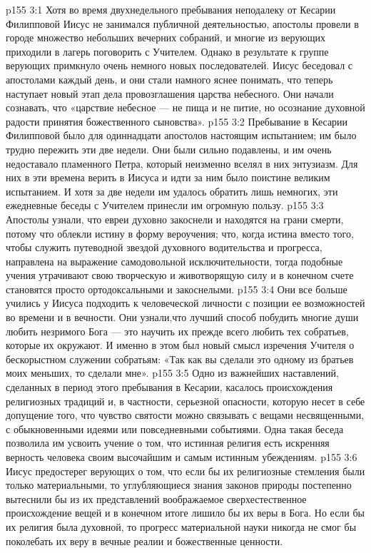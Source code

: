 \vs p155 3:1 Хотя во время двухнедельного пребывания неподалеку от Кесарии Филипповой Иисус не занимался публичной деятельностью, апостолы провели в городе множество небольших вечерних собраний, и многие из верующих приходили в лагерь поговорить с Учителем. Однако в результате к группе верующих примкнуло очень немного новых последователей. Иисус беседовал с апостолами каждый день, и они стали намного яснее понимать, что теперь наступает новый этап дела провозглашения царства небесного. Они начали сознавать, что «царствие небесное --- не пища и не питие, но осознание духовной радости принятия божественного сыновства».
\vs p155 3:2 Пребывание в Кесарии Филипповой было для одиннадцати апостолов настоящим испытанием; им было трудно пережить эти две недели. Они были сильно подавлены, и им очень недоставало пламенного Петра, который неизменно вселял в них энтузиазм. Для них в эти времена верить в Иисуса и идти за ним было поистине великим испытанием. И хотя за две недели им удалось обратить лишь немногих, эти ежедневные беседы с Учителем принесли им огромную пользу.
\vs p155 3:3 Апостолы узнали, что евреи духовно закоснели и находятся на грани смерти, потому что облекли истину в форму вероучения; что, когда истина вместо того, чтобы служить путеводной звездой духовного водительства и прогресса, направлена на выражение самодовольной исключительности, тогда подобные учения утрачивают свою творческую и животворящую силу и в конечном счете становятся просто ортодоксальными и закоснелыми.
\vs p155 3:4 Они все больше учились у Иисуса подходить к человеческой личности с позиции ее возможностей во времени и в вечности. Они узнали,что лучший способ побудить многие души любить незримого Бога --- это научить их прежде всего любить тех собратьев, которые их окружают. И именно в этом был новый смысл изречения Учителя о бескорыстном служении собратьям: «Так как вы сделали это одному из братьев моих меньших, то сделали мне».
\vs p155 3:5 Одно из важнейших наставлений, сделанных в период этого пребывания в Кесарии, касалось происхождения религиозных традиций и, в частности, серьезной опасности, которую несет в себе допущение того, что чувство святости можно связывать с вещами несвященными, с обыкновенными идеями или повседневными событиями. Одна такая беседа позволила им усвоить учение о том, что истинная религия есть искренняя верность человека своим высочайшим и самым истинным убеждениям.
\vs p155 3:6 Иисус предостерег верующих о том, что если бы их религиозные стемления были только материальными, то углубляющиеся знания законов природы постепенно вытеснили бы из их представлений воображаемое сверхестественное происхождение вещей и в конечном итоге лишило бы их веры в Бога. Но если бы их религия была духовной, то прогресс материальной науки никогда не смог бы поколебать их веру в вечные реалии и божественные ценности.
